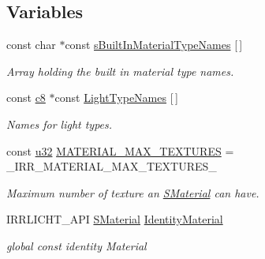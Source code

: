 \subsection*{Variables}
\begin{DoxyCompactItemize}
\item 
const char $\ast$const \hyperlink{namespaceirr_1_1video_a833460ba01098710b6df3ec5c281c873}{s\+Built\+In\+Material\+Type\+Names} \mbox{[}$\,$\mbox{]}
\begin{DoxyCompactList}\small\item\em Array holding the built in material type names. \end{DoxyCompactList}\item 
const \hyperlink{namespaceirr_a9395eaea339bcb546b319e9c96bf7410}{c8} $\ast$const \hyperlink{namespaceirr_1_1video_a345c3fd9c805bbe508a49fa367846bc8}{Light\+Type\+Names} \mbox{[}$\,$\mbox{]}
\begin{DoxyCompactList}\small\item\em Names for light types. \end{DoxyCompactList}\item 
const \hyperlink{namespaceirr_a0416a53257075833e7002efd0a18e804}{u32} \hyperlink{namespaceirr_1_1video_ad41ca808200ca2e8e9d9326355020052}{M\+A\+T\+E\+R\+I\+A\+L\+\_\+\+M\+A\+X\+\_\+\+T\+E\+X\+T\+U\+R\+ES} = \+\_\+\+I\+R\+R\+\_\+\+M\+A\+T\+E\+R\+I\+A\+L\+\_\+\+M\+A\+X\+\_\+\+T\+E\+X\+T\+U\+R\+E\+S\+\_\+\hypertarget{namespaceirr_1_1video_ad41ca808200ca2e8e9d9326355020052}{}\label{namespaceirr_1_1video_ad41ca808200ca2e8e9d9326355020052}

\begin{DoxyCompactList}\small\item\em Maximum number of texture an \hyperlink{classirr_1_1video_1_1SMaterial}{S\+Material} can have. \end{DoxyCompactList}\item 
I\+R\+R\+L\+I\+C\+H\+T\+\_\+\+A\+PI \hyperlink{classirr_1_1video_1_1SMaterial}{S\+Material} \hyperlink{namespaceirr_1_1video_a6c7a0046dcf64bb165eca2af94045a61}{Identity\+Material}\hypertarget{namespaceirr_1_1video_a6c7a0046dcf64bb165eca2af94045a61}{}\label{namespaceirr_1_1video_a6c7a0046dcf64bb165eca2af94045a61}

\begin{DoxyCompactList}\small\item\em global const identity Material \end{DoxyCompactList}\end{DoxyCompactItemize}


